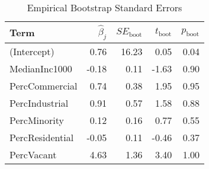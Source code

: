 \begin{table}[ht]
\centering
\begin{tabular}{lrrrr}
  \hline
Term & $\widehat{\beta}_{j}$ & $SE_{\text{boot}}$ & $t_{\text{boot}}$ & $p_{\text{boot}}$ \\ 
  \hline
(Intercept) & 0.76 & 16.23 & 0.05 & 0.04 \\ 
  MedianInc1000 & -0.18 & 0.11 & -1.63 & 0.90 \\ 
  PercCommercial & 0.74 & 0.38 & 1.95 & 0.95 \\ 
  PercIndustrial & 0.91 & 0.57 & 1.58 & 0.88 \\ 
  PercMinority & 0.12 & 0.16 & 0.77 & 0.55 \\ 
  PercResidential & -0.05 & 0.11 & -0.46 & 0.37 \\ 
  PercVacant & 4.63 & 1.36 & 3.40 & 1.00 \\ 
   \hline
\end{tabular}
\caption{Empirical Bootstrap Standard Errors} 
\end{table}
